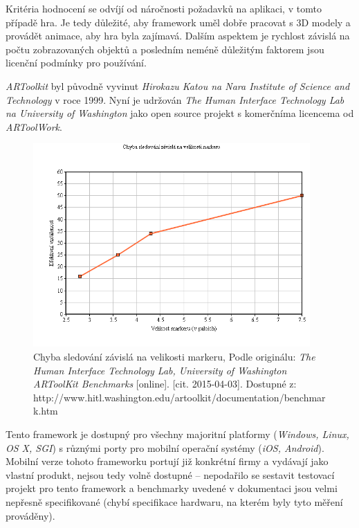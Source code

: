 \documentclass[twoside,12pt]{article}
\begin{document}
% 
\newpage 


Kritéria hodnocení se odvíjí od náročnosti požadavků na aplikaci, v tomto případě hra. Je tedy důležité, aby framework uměl dobře pracovat s 3D modely a provádět animace, aby hra byla zajímavá. Dalším aspektem je rychlost závislá na počtu zobrazovaných objektů a posledním neméně důležitým faktorem jsou licenční podmínky pro používání.


\textit{ARToolkit} byl původně vyvinut \textit{Hirokazu Katou na Nara Institute of Science and Technology} v roce 1999. Nyní je udržován \textit{The Human Interface Technology Lab na University of Washington} jako open source projekt s komerčníma licencema od \textit{ARToolWork}.

\begin{figure}[H]
    \includegraphics[width=400px, center]{images/artoolkit_benchmark.png}
    \caption{Chyba sledování závislá na velikosti markeru, Podle originálu: \textit{The Human Interface Technology Lab, University of Washington ARToolKit Benchmarks}
	[online]. [cit. 2015-04-03]. Dostupné z: http://www.hitl.washington.edu/artoolkit/documentation/benchmark.htm
}
    \label{artoolkit_benchmark}
\end{figure}
 Tento framework je dostupný pro všechny majoritní platformy (\textit{Windows, Linux, OS X, SGI}) s různými porty pro mobilní operační systémy (\textit{iOS, Android}). Mobilní verze tohoto frameworku portují již konkrétní firmy a vydávají jako vlastní produkt, nejsou tedy volně dostupné -- nepodařilo se sestavit testovací projekt pro tento framework a benchmarky uvedené v dokumentaci jsou velmi nepřesně specifikované (chybí specifikace hardwaru, na kterém byly tyto měření prováděny). 
\end{document}
